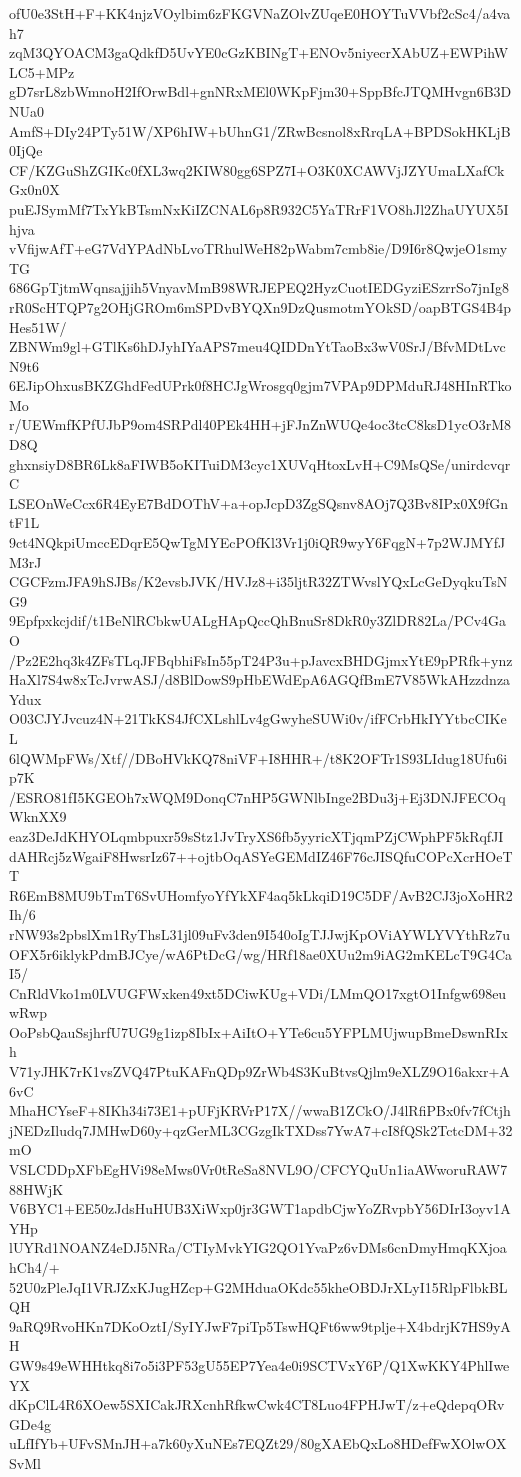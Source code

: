 ofU0e3StH+F+KK4njzVOylbim6zFKGVNaZOlvZUqeE0HOYTuVVbf2cSc4/a4vah7
zqM3QYOACM3gaQdkfD5UvYE0cGzKBINgT+ENOv5niyecrXAbUZ+EWPihWLC5+MPz
gD7srL8zbWmnoH2IfOrwBdl+gnNRxMEl0WKpFjm30+SppBfcJTQMHvgn6B3DNUa0
AmfS+DIy24PTy51W/XP6hIW+bUhnG1/ZRwBcsnol8xRrqLA+BPDSokHKLjB0IjQe
CF/KZGuShZGIKc0fXL3wq2KIW80gg6SPZ7I+O3K0XCAWVjJZYUmaLXafCkGx0n0X
puEJSymMf7TxYkBTsmNxKiIZCNAL6p8R932C5YaTRrF1VO8hJl2ZhaUYUX5Ihjva
vVfijwAfT+eG7VdYPAdNbLvoTRhulWeH82pWabm7cmb8ie/D9I6r8QwjeO1smyTG
686GpTjtmWqnsajjih5VnyavMmB98WRJEPEQ2HyzCuotIEDGyziESzrrSo7jnIg8
rR0ScHTQP7g2OHjGROm6mSPDvBYQXn9DzQusmotmYOkSD/oapBTGS4B4pHes51W/
ZBNWm9gl+GTlKs6hDJyhIYaAPS7meu4QIDDnYtTaoBx3wV0SrJ/BfvMDtLvcN9t6
6EJipOhxusBKZGhdFedUPrk0f8HCJgWrosgq0gjm7VPAp9DPMduRJ48HInRTkoMo
r/UEWmfKPfUJbP9om4SRPdl40PEk4HH+jFJnZnWUQe4oc3tcC8ksD1ycO3rM8D8Q
ghxnsiyD8BR6Lk8aFIWB5oKITuiDM3cyc1XUVqHtoxLvH+C9MsQSe/unirdcvqrC
LSEOnWeCcx6R4EyE7BdDOThV+a+opJcpD3ZgSQsnv8AOj7Q3Bv8IPx0X9fGntF1L
9ct4NQkpiUmccEDqrE5QwTgMYEcPOfKl3Vr1j0iQR9wyY6FqgN+7p2WJMYfJM3rJ
CGCFzmJFA9hSJBs/K2evsbJVK/HVJz8+i35ljtR32ZTWvslYQxLcGeDyqkuTsNG9
9Epfpxkcjdif/t1BeNlRCbkwUALgHApQccQhBnuSr8DkR0y3ZlDR82La/PCv4GaO
/Pz2E2hq3k4ZFsTLqJFBqbhiFsIn55pT24P3u+pJavcxBHDGjmxYtE9pPRfk+ynz
HaXl7S4w8xTcJvrwASJ/d8BlDowS9pHbEWdEpA6AGQfBmE7V85WkAHzzdnzaYdux
O03CJYJvcuz4N+21TkKS4JfCXLshlLv4gGwyheSUWi0v/ifFCrbHkIYYtbcCIKeL
6lQWMpFWs/Xtf//DBoHVkKQ78niVF+I8HHR+/t8K2OFTr1S93LIdug18Ufu6ip7K
/ESRO81fI5KGEOh7xWQM9DonqC7nHP5GWNlbInge2BDu3j+Ej3DNJFECOqWknXX9
eaz3DeJdKHYOLqmbpuxr59sStz1JvTryXS6fb5yyricXTjqmPZjCWphPF5kRqfJI
dAHRcj5zWgaiF8HwsrIz67++ojtbOqASYeGEMdIZ46F76cJISQfuCOPcXcrHOeTT
R6EmB8MU9bTmT6SvUHomfyoYfYkXF4aq5kLkqiD19C5DF/AvB2CJ3joXoHR2Ih/6
rNW93s2pbslXm1RyThsL31jl09uFv3den9I540oIgTJJwjKpOViAYWLYVYthRz7u
OFX5r6iklykPdmBJCye/wA6PtDcG/wg/HRf18ae0XUu2m9iAG2mKELcT9G4CaI5/
CnRldVko1m0LVUGFWxken49xt5DCiwKUg+VDi/LMmQO17xgtO1Infgw698euwRwp
OoPsbQauSsjhrfU7UG9g1izp8IbIx+AiItO+YTe6cu5YFPLMUjwupBmeDswnRIxh
V71yJHK7rK1vsZVQ47PtuKAFnQDp9ZrWb4S3KuBtvsQjlm9eXLZ9O16akxr+A6vC
MhaHCYseF+8IKh34i73E1+pUFjKRVrP17X//wwaB1ZCkO/J4lRfiPBx0fv7fCtjh
jNEDzIludq7JMHwD60y+qzGerML3CGzgIkTXDss7YwA7+cI8fQSk2TctcDM+32mO
VSLCDDpXFbEgHVi98eMws0Vr0tReSa8NVL9O/CFCYQuUn1iaAWworuRAW788HWjK
V6BYC1+EE50zJdsHuHUB3XiWxp0jr3GWT1apdbCjwYoZRvpbY56DIrI3oyv1AYHp
lUYRd1NOANZ4eDJ5NRa/CTIyMvkYIG2QO1YvaPz6vDMs6cnDmyHmqKXjoahCh4/+
52U0zPleJqI1VRJZxKJugHZcp+G2MHduaOKdc55kheOBDJrXLyI15RlpFlbkBLQH
9aRQ9RvoHKn7DKoOztI/SyIYJwF7piTp5TswHQFt6ww9tplje+X4bdrjK7HS9yAH
GW9s49eWHHtkq8i7o5i3PF53gU55EP7Yea4e0i9SCTVxY6P/Q1XwKKY4PhlIweYX
dKpClL4R6XOew5SXICakJRXcnhRfkwCwk4CT8Luo4FPHJwT/z+eQdepqORvGDe4g
uLfIfYb+UFvSMnJH+a7k60yXuNEs7EQZt29/80gXAEbQxLo8HDefFwXOlwOXSvMl
